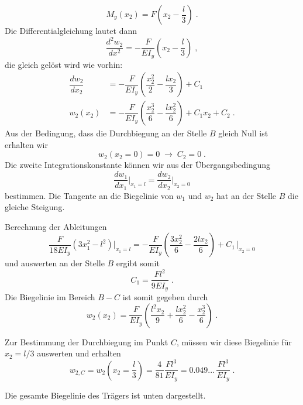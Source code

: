 \begin{example}
\begin{equation}
		M_y(x_2) = F\left(x_2-\dfrac{l}{3}\right) \; .
	\end{equation}
	Die Differentialgleichung lautet dann
	\begin{equation}
	\dfrac{d^2w_2}{dx^2}=-\dfrac{F}{EI_y}\left(x_2-\dfrac{l}{3}\right) \; ,
	\end{equation}
	die gleich gelöst wird wie vorhin:
	\begin{equation}
	\begin{split}
		\dfrac{dw_2}{dx_2} &= -\dfrac{F}{EI_y}\left(\dfrac{x_2^2}{2}-\dfrac{lx_2}{3}\right) + C_1\\
		w_2(x_2) &= -\dfrac{F}{EI_y}\left(\dfrac{x_2^3}{6}-\dfrac{lx_2^2}{6}\right) + C_1x_2 + C_2 \; . 
	\end{split}
	\end{equation}
	Aus der Bedingung, dass die Durchbiegung an der Stelle $B$ gleich Null ist erhalten wir
	\begin{equation}
	w_2(x_2=0) = 0 \;\rightarrow\;C_2 = 0 \; .
	\end{equation}
	Die zweite Integrationskonstante können wir aus der Übergangsbedingung
	\begin{equation}
	\dfrac{dw_1}{dx_1}\Bigg|_{x_1=l} = \dfrac{dw_2}{dx_2}\Bigg|_{x_2=0}
	\end{equation}
	bestimmen. Die Tangente an die Biegelinie von $w_1$ und $w_2$ hat an der Stelle $B$ die gleiche Steigung.
	\begin{center}
		
	\end{center}
	Berechnung  der Ableitungen
	\begin{equation}
	\dfrac{F}{18EI_y}\left(3x_1^2-l^2\right)\Bigg|_{x_1=l}=-\dfrac{F}{EI_y}\left(\dfrac{3x_2^2}{6}-\dfrac{2lx_2}{6}\right)+C_1\,\Bigg|_{x_2=0}
	\end{equation}
	und auswerten an der Stelle $B$ ergibt somit
	\begin{equation}
	C_1 = \dfrac{Fl^2}{9EI_y} \; .
	\end{equation}
	Die Biegelinie im Bereich $B-C$ ist somit gegeben durch
	\[
	w_2(x_2) = \dfrac{F}{EI_y}\left(\dfrac{l^2x_2}{9}+\dfrac{lx_2^2}{6}-\dfrac{x_2^3}{6}\right)\; .
	\]
	
	Zur Bestimmung der Durchbiegung im Punkt $C$, müssen wir diese Biegelinie für $x_2=l/3$ auswerten und erhalten
	\[
	w_{2,C} = w_2\left(x_2=\dfrac{l}{3}\right)=\dfrac{4}{81}\dfrac{Fl^3}{EI_y}=0.049...\,\dfrac{Fl^3}{EI_y} \;.
	\]
	
	Die gesamte Biegelinie des Trägers ist unten dargestellt.
	\begin{center}
		
	\end{center}
	
\end{example}

